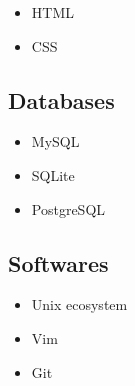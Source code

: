 \documentclass[a4paper]{article}
\begin{document}
\begin{itemize}
  \item HTML
  \item CSS
\end{itemize}

\subsection*{Databases}

\begin{itemize}
  \item MySQL
  \item SQLite
  \item PostgreSQL
\end{itemize}

\subsection*{Softwares}

\begin{itemize}
  \item Unix ecosystem
  \item Vim
  \item Git
\end{itemize}
\end{document}
